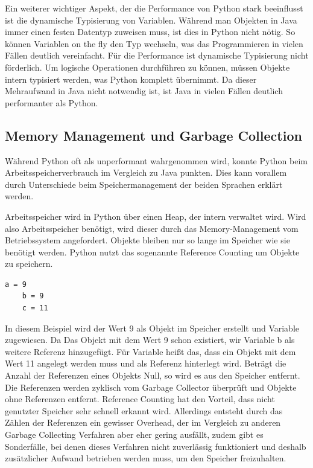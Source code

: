 Ein weiterer wichtiger Aspekt, der die Performance von Python stark beeinflusst ist die dynamische Typisierung von Variablen. 
Während man Objekten in Java immer einen festen Datentyp zuweisen muss, ist dies in Python nicht nötig. So können Variablen on the 
fly den Typ wechseln, was das Programmieren in vielen Fällen deutlich vereinfacht. Für die Performance ist dynamische Typisierung 
nicht förderlich. Um logische Operationen durchführen zu können, müssen Objekte intern typisiert werden, was Python komplett übernimmt. 
Da dieser Mehraufwand in Java nicht notwendig ist, ist Java in vielen Fällen deutlich performanter als Python.\autocite[Vgl.][]{Shaw.16.7.2018}


\subsection{Memory Management und Garbage Collection}
Während Python oft als unperformant wahrgenommen wird, konnte Python beim Arbeitsspeicherverbrauch im Vergleich 
zu Java punkten. Dies kann vorallem durch Unterschiede beim Speichermanagement der beiden Sprachen erklärt werden. 

Arbeitsspeicher wird in Python über einen Heap, der intern verwaltet wird. Wird also Arbeitsspeicher benötigt, 
wird dieser durch das Memory-Management vom Betriebssystem angefordert. Objekte bleiben nur so lange im Speicher 
wie sie benötigt werden. Python nutzt das sogenannte Reference Counting um Objekte zu speichern.

\begin{lstlisting}[caption={Codebeispiel zur Verwaltung von Objekten in Python}]
    a = 9
    b = 9
    c = 11
\end{lstlisting}

In diesem Beispiel wird der Wert 9 als Objekt im Speicher erstellt und Variable  zugewiesen. Da 
Das Objekt mit dem Wert 9 schon existiert, wir Variable {b} als weitere Referenz hinzugefügt. Für Variable 
 heißt das, dass ein Objekt mit dem Wert 11 angelegt werden muss und  als Referenz hinterlegt wird. 
Beträgt die Anzahl der Referenzen eines Objekts Null, so wird es aus den Speicher entfernt. Die Referenzen 
werden zyklisch vom Garbage Collector überprüft und Objekte ohne Referenzen entfernt.\autocite[Vgl.][]{PabloGalindoSalgado.2021} 
Reference Counting hat den Vorteil, dass nicht genutzter Speicher sehr schnell erkannt wird. Allerdings entsteht durch das Zählen 
der Referenzen ein gewisser Overhead, der im Vergleich zu anderen Garbage Collecting Verfahren aber eher gering ausfällt, 
zudem gibt es Sonderfälle, bei denen dieses Verfahren nicht zuverlässig funktioniert und deshalb zusätzlicher Aufwand 
betrieben werden muss, um den Speicher freizuhalten.


